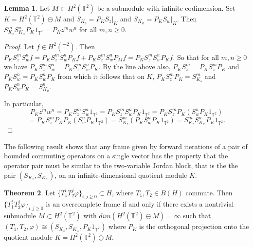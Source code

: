 \documentclass[12pt,reqno]{amsart}
\theoremstyle{definition}
\newtheorem{theorem}{Theorem} [section]
\theoremstyle{definition}
\newtheorem{lemma}[theorem]{Lemma}
\numberwithin{equation}{section}
\begin{document}
\begin{lemma} \label{twovar}
Let $M \subset H^2(\mathbb{T}^2)$ be a submodule with infinite codimension. Set $K = H^2(\mathbb{T}^2) \ominus M$ and $S_{K_z} = P_{K} \left.S_{z}\right|_{K} $ and  $S_{K_w} = P_{K} \left.S_{w}\right|_{K}$. 
Then $S_{K_z}^m S_{K_w}^n P_{K} {1}_{\mathbb{T}^2} = P_{K} z^mw^n$ for all $m, n \geq 0$.
\end{lemma}
\begin{proof}
Let $f \in H^2(\mathbb{T}^2)$. Then  $P_{K} S_{z}^m S_{w}^n f = P_{K} S_{z}^m S_{w}^n P_{K} f + P_{K} S_{z}^m S_{w}^n P_{M} f = P_{K} S_{z}^m S_{w}^n P_{K} f$. So that for all $m, n \geq 0$ we have $P_{K} S_{z}^m S_{w}^n =P_{K} S_{z}^m S_{w}^n P_{K}$.
\newline
By the line above also, $P_{K} S_{z}^m  = P_{K} S_{z}^m P_{K} $ and $P_{K} S_{w}^n  = P_{K} S_{w}^n P_{K} $ from which it follows that on $K$, $P_{K} S_{z}^m P_{K} = S_{K_z}^m$ and $P_{K} S_{w}^n P_{K} = S_{K_w}^n$.

In particular, 
\begin{displaymath}
P_{K} z^m w^n =P_{K} S_{z}^m S_{w}^n {1}_{\mathbb{T}^2} = P_{K} S_{z}^m S_{w}^n P_{K} {1}_{\mathbb{T}^2} =
P_{K} S_{z}^m P_{K} (S_{w}^n P_{K} {1}_{\mathbb{T}^2})
\end{displaymath}
\begin{displaymath}
 = P_{K} S_{z}^m P_{K} P_{K} (S_{w}^n P_{K} {1}_{\mathbb{T}^2}) = S_{K_z}^m(P_{K} S_{w}^n P_{K} {1}_{\mathbb{T}^2}) =  S_{K_z}^m S_{K_w}^n P_{K} {1}_{\mathbb{T}^2}.
\end{displaymath}
\end{proof}

The following result shows that any frame given by forward iterations of a pair of bounded commuting operators on a single vector has the property that the operator pair must be similar to the two-variable Jordan block, that is the the pair  $(S_{K_z}, S_{K_w})$, on an infinite-dimensional quotient module $K$. 

\begin{theorem}\label{char}
Let $\{T_1^iT_2^j\varphi\}_{i,j \geq 0} \subset H$, where $T_1, T_2  \in B(H)$ commute. Then $\{T_1^iT_2^j\varphi\}_{i,j \geq 0}$ is an overcomplete frame if and only if there exists a nontrivial submodule $M \subset H^2(\mathbb{T}^2)$ with $dim(H^2(\mathbb{T}^2) \ominus M) = \infty$ such that $(T_1, T_2, \varphi)\cong (S_{K_z}, S_{K_w}, P_{K} {1}_{\mathbb{T}^2})$ where $P_{K}$ is the orthogonal projection onto the quotient module $K = H^2(\mathbb{T}^2) \ominus M$.  
\end{theorem}
\end{document}
